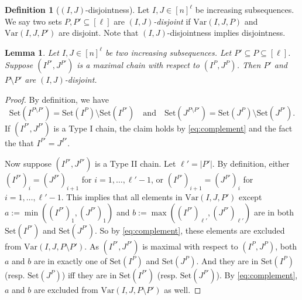 \documentclass[11pt]{article}
\theoremstyle{plain}
\newtheorem{lemma}[thm]{Lemma}
\theoremstyle{definition}
\newtheorem{defn}[thm]{Definition}
\theoremstyle{remark}
\newcommand{\range}{\mathrm{Set}}
\newcommand{\var}{\mathrm{Var}}
\begin{document}
\begin{defn}[$(I,J)$-disjointness]\label{defn:disjointness}
Let $I,J\in[n]^\ell$ be increasing subsequences.
We say two sets $P,P'\subseteq [\ell]$ are \emph{$(I,J)$-disjoint} if $\var(I,J,P)$ and $\var(I,J,P')$ are disjoint. Note that $(I,J)$-disjointness implies disjointness.
\end{defn}

\begin{lemma}\label{lemma:disjointness}
Let $I,J\in[n]^{\ell}$ be two increasing subsequences.
Let $P'\subseteq P\subseteq [\ell]$. 
Suppose $(I^{P'}, J^{P'})$ is a maximal chain with respect to $(I^P,J^P)$.
Then $P'$ and $P\setminus P'$ are $(I,J)$-disjoint.
\end{lemma}
\begin{proof}
By definition, we have
\begin{equation}\label{eq:complement}
\range(I^{P\setminus P'})=\range(I^P)\setminus \range(I^{P'}) \quad\text{and}\quad \range(J^{P\setminus P'})=\range(J^P)\setminus \range(J^{P'}).
\end{equation}
If $(I^{P'},J^{P'})$ is a Type I chain, the claim holds by \eqref{eq:complement} and the fact the that $I^{P'}=J^{P'}$.

Now suppose $(I^{P'},J^{P'})$ is a Type II chain.
Let $\ell'=|P'|$.
By definition, either $(I^{P'})_{i} = (J^{P'})_{i+1}$ for $i=1,\dots,\ell'-1$, or $(I^{P'})_{i+1} = (J^{P'})_{i}$ for $i=1,\dots,\ell'-1$.
This implies that all elements in $\var(I,J,P')$ except $a:=\min((I^{P'})_1,(J^{P'})_1)$ and $b:=\max((I^{P'})_{\ell'},(J^{P'})_{\ell'})$ are in both $\range(I^{P'})$ and $\range(J^{P'})$. So by \eqref{eq:complement}, these elements are excluded from $\var(I,J,P\setminus P')$.
As $(I^{P'}, J^{P'})$ is maximal with respect to $(I^P,J^P)$, both $a$ and $b$ are in exactly one of $\range(I^P)$ and $\range(J^P)$. 
And they are in $\range(I^P)$ (resp. $\range(J^P)$) iff they are in $\range(I^{P'})$ (resp. $\range(J^{P'})$).
By \eqref{eq:complement}, $a$ and $b$ are excluded from $\var(I,J,P\setminus P')$ as well.
\end{proof}
\end{document}
